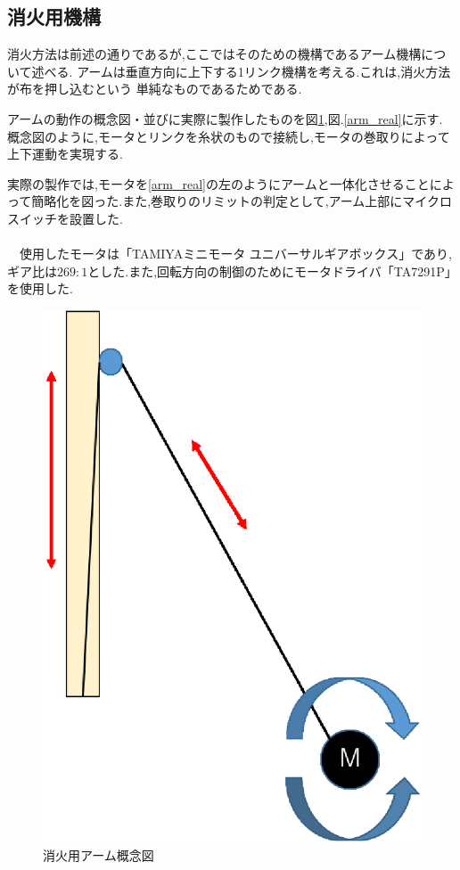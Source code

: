 \subsection{消火用機構}
消火方法は前述の通りであるが,ここではそのための機構であるアーム機構について述べる.
アームは垂直方向に上下する1リンク機構を考える.これは,消火方法が布を押し込むという
単純なものであるためである.

アームの動作の概念図・並びに実際に製作したものを図\ref{arm_con},図.\ref{arm_real}に示す.
概念図のように,モータとリンクを糸状のもので接続し,モータの巻取りによって上下運動を実現する.

実際の製作では,モータを\ref{arm_real}の左のようにアームと一体化させることによって簡略化を図った.また,巻取りのリミットの判定として,アーム上部にマイクロスイッチを設置した.
\\
\\
\ \ 使用したモータは「TAMIYAミニモータ ユニバーサルギアボックス」であり,ギア比は$269:1$とした.また,回転方向の制御のためにモータドライバ「TA7291P」を使用した.

\begin{figure}[h]
 \centering
   \includegraphics[clip,scale=0.4]{../../report_3/kakeru_report_03/picture/arm_img.eps}
   \caption{消火用アーム概念図}	       
 \label{arm_con}		       
\end{figure}			       
				       
